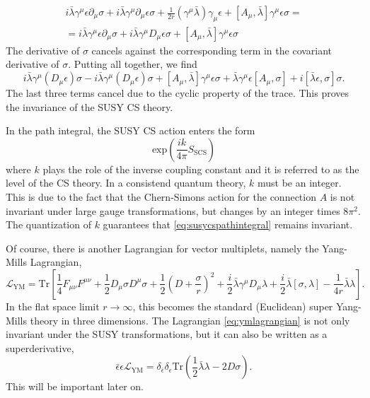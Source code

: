  \begin{multline}
    i\bar{\lambda}\gamma^\mu\epsilon\partial_\mu\sigma
    + i\bar{\lambda}\gamma^\mu\partial_\mu\epsilon\sigma
    + \frac{1}{2r}(\gamma^\mu\bar{\lambda})\gamma_\mu\epsilon
    + \left[A_\mu,\bar{\lambda}\right]\gamma^\mu\epsilon\sigma=\\
    =i\bar{\lambda}\gamma^\mu\epsilon\partial_\mu\sigma
    + i\bar{\lambda}\gamma^\mu D_\mu \epsilon \sigma + \left[A_\mu,
    \bar{\lambda}\right]\gamma^\mu\epsilon\sigma
  \end{multline}
  The derivative of $\sigma$ cancels against the corresponding term in the
  covariant derivative of $\sigma$. Putting all together, we find
  \begin{equation}
    i\bar{\lambda}\gamma^\mu(D_\mu\epsilon)\sigma
    - i \bar{\lambda}\gamma^\mu(D_\mu\epsilon)\sigma + \left[A_\mu,
    \bar{\lambda}\right]\gamma^\mu\epsilon\sigma
      + \bar{\lambda}\gamma^\mu\epsilon\left[A_\mu,
      \sigma\right]+i\left[\bar{\lambda}\epsilon,\sigma\right]\sigma.
\end{equation}
The last three terms cancel due to the cyclic property of the trace. This
proves the invariance of the SUSY CS theory.
\par In the path integral, the SUSY CS action enters the form
\begin{equation}
 \mathrm{exp}\left(\frac{ik}{4\pi}S_{\mathrm{SCS}}\right)
 \label{eq:susycspathintegral}
\end{equation}
where $k$ plays the role of the inverse coupling constant and it is referred to
as the level of the CS theory. In a consistend quantum theory,  $k$ must be an
integer. This is due to the fact that the Chern-Simons action for the
connection $A$ is not invariant under large gauge transformations, but changes
by an integer times $8\pi^2$. The quantization of $k$ guarantees that
\eqref{eq:susycspathintegral} remains invariant.
\par Of course, there  is another Lagrangian for vector multiplets, namely
the Yang-Mills Lagrangian,
\begin{equation}
  \mathcal{L}_{\mathrm{YM}} = \mathrm{Tr}\left[\frac{1}{4}F_{\mu\nu}F^{\mu\nu}
    + \frac{1}{2}D_\mu\sigma D^\mu\sigma
    + \frac{1}{2}\left(D+\frac{\sigma}{r}\right)^2
    + \frac{i}{2}\bar{\lambda}\gamma^\mu D_\mu \lambda
    + \frac{i}{2}\bar{\lambda}\left[\sigma,\lambda\right]
  - \frac{1}{4r}\bar{\lambda}\lambda\right].
  \label{eq:ymlagrangian}
\end{equation}
In the flat space limit $r\rightarrow\infty$, this becomes the standard
(Euclidean) super Yang-Mills theory in three dimensions. The Lagrangian
\eqref{eq:ymlagrangian} is not only invariant under the SUSY transformations,
but it can also be written as a superderivative,
\begin{equation}
  \bar{\epsilon}\epsilon\mathcal{L}_{\mathrm{YM}}
  = \delta_{\bar{\epsilon}}\delta_{\epsilon}\mathrm{Tr}\left(\frac{1}{2}\bar{\lambda}\lambda
  - 2D\sigma\right).
\end{equation}
This will be important later on.
